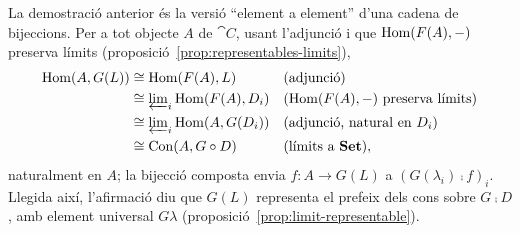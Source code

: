 \begin{observacio}
La demostració anterior és la versió \enquote{element a element} d'una cadena de bijeccions. Per a tot objecte $A$ de $\cat{C}$, usant l'adjunció i que $\operatorname{Hom}(F(A),-)$ preserva límits (proposició~\ref{prop:representables-limits}),
\[
\begin{aligned}
\operatorname{Hom}(A,G(L))&\cong\operatorname{Hom}(F(A),L) &&\text{(adjunció)}\\
&\cong\varprojlim\nolimits_i\operatorname{Hom}(F(A),D_i) &&\text{($\operatorname{Hom}(F(A),-)$ preserva límits)}\\
&\cong\varprojlim\nolimits_i\operatorname{Hom}(A,G(D_i)) &&\text{(adjunció, natural en $D_i$)}\\
&\cong\mathrm{Con}(A,G\circ D) &&\text{(límits a $\mathbf{Set}$)},
\end{aligned}
\]
naturalment en $A$; la bijecció composta envia $f\colon A\to G(L)$ a $(G(\lambda_i)\comp f)_i$. Llegida així, l'afirmació diu que $G(L)$ representa el prefeix dels cons sobre $G\comp D$, amb element universal $G\lambda$ (proposició~\ref{prop:limit-representable}).
\end{observacio}

